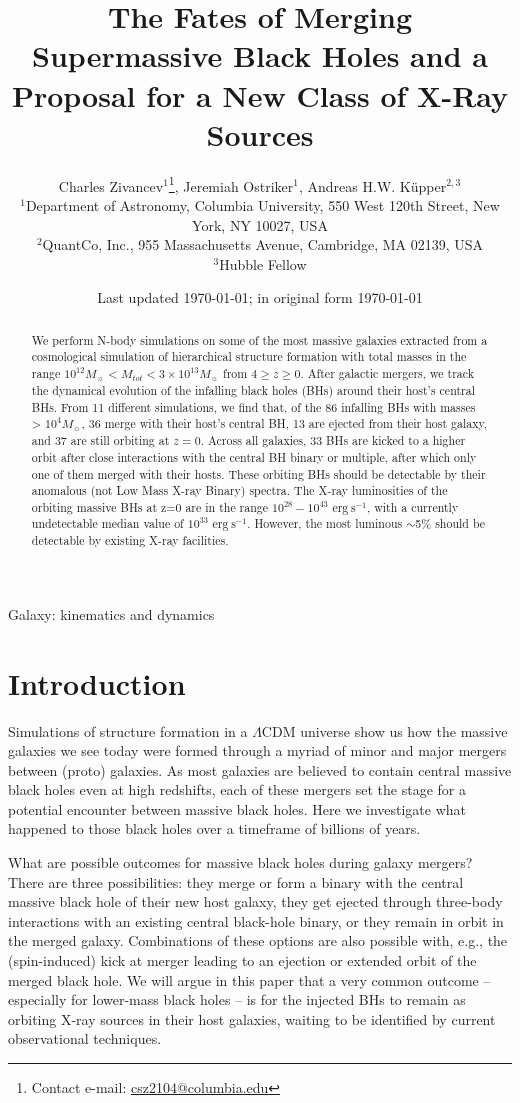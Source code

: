 \documentclass[fleqn,usenatbib,useAMS]{mnras}
\title[MNRAS]{The Fates of Merging Supermassive Black Holes and a Proposal for a New Class of X-Ray Sources}
\author[]{
Charles Zivancev$^{1}$\thanks{Contact e-mail: \href{mailto:csz2104@columbia.edu}{csz2104@columbia.edu}},
Jeremiah Ostriker$^{1}$,
Andreas H.W. K\"upper$^{2,3}$
\\
$^{1}$Department of Astronomy, Columbia University, 550 West 120th Street, New York, NY 10027, USA\\
$^{2}$QuantCo, Inc., 955 Massachusetts Avenue, Cambridge, MA 02139, USA\\
$^{3}$Hubble Fellow\\
}
\date{Last updated \today; in original form \today}
\begin{document}
\label{firstpage}
\pagerange{\pageref{firstpage}--\pageref{lastpage}}
\maketitle



\begin{abstract}
We perform N-body simulations on some of the most massive galaxies extracted from a cosmological simulation of hierarchical structure formation with total masses in the range $10^{12} M_{\sun} < M_{tot} < 3\times 10^{13} M_{\sun}$ from $4\geq z \geq 0$.  After galactic mergers, we track the dynamical evolution of the infalling black holes (BHs) around their host's central BHs.  From 11 different simulations, we find that, of the 86 infalling BHs with masses > $10^4 M_{\sun}$, 36 merge with their host's central BH, 13 are ejected from their host galaxy, and 37 are still orbiting at $z=0$.  Across all galaxies, 33 BHs are kicked to a higher orbit after close interactions with the central BH binary or multiple, after which only one of them merged with their hosts.  These orbiting BHs should be detectable by their anomalous (not Low Mass X-ray Binary) spectra.  The X-ray luminosities of the orbiting massive BHs at z=0 are in the range $10^{28}-10^{43}$ $\mathrm{erg}~\mathrm{s}^{-1}$, with a currently undetectable median value of $10^{33}$ $\mathrm{erg}~\mathrm{s}^{-1}$.  However, the most luminous $\sim$5\% should be detectable by existing X-ray facilities.
\end{abstract}


\begin{keywords}
Galaxy: kinematics and dynamics
\end{keywords}




\section{Introduction}\label{sec:introduction}
Simulations of structure formation in a $\Lambda$CDM universe show us how the massive galaxies we see today were formed through a myriad of minor and major mergers between (proto) galaxies. As most galaxies are believed to contain central massive black holes even at high redshifts, each of these mergers set the stage for a potential encounter between massive black holes. Here we investigate what happened to those black holes over a timeframe of billions of years.

What are possible outcomes for massive black holes during galaxy mergers?  There are three possibilities: they merge or form a binary with the central massive black hole of their new host galaxy, they get ejected through three-body interactions with an existing central black-hole binary, or they remain in orbit in the merged galaxy.  Combinations of these options are also possible with, e.g., the (spin-induced) kick at merger leading to an ejection or extended orbit of the merged black hole. We will argue in this paper that a very common outcome -- especially for lower-mass black holes -- is for the injected BHs to remain as orbiting X-ray sources in their host galaxies, waiting to be identified by current observational techniques.
\end{document}
